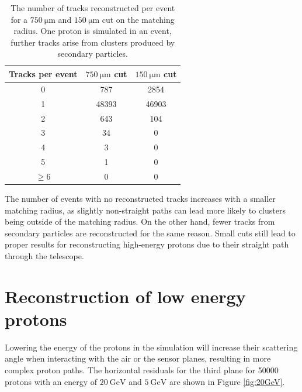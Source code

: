 \begin{table}
  \centering
  \caption{The number of tracks reconstructed per event for a
  $\SI{750}{\micro\meter}$ and $\SI{150}{\micro\meter}$ cut on the
  matching radius. One proton is simulated in an event, further tracks arise from clusters
  produced by secondary particles.}
  \begin{tabular}{c | c c}
    \toprule
    Tracks per event &  $\SI{750}{\micro\meter}$ cut & $\SI{150}{\micro\meter}$ cut\\
    \midrule
    0 & 787    & 2854  \\
    1 & 48393  & 46903  \\
    2 & 643    & 104  \\
    3 & 34     & 0  \\
    4 & 3      & 0   \\
    5 & 1      & 0    \\
    $\geq$6 & 0 & 0 \\
  \end{tabular}
  \label{tab:cluster_per_track}
\end{table}

The number of events with no reconstructed tracks increases with a smaller matching radius, as slightly non-straight paths can lead
more likely to clusters being outside of the matching radius. On the other hand, fewer tracks from secondary particles are reconstructed
for the same reason. Small cuts still lead to proper results
for reconstructing high-energy protons due to their straight path through the telescope.



\section{Reconstruction of low energy protons}\label{sec:energy}
Lowering the energy of the protons in the simulation will increase their scattering angle when interacting with the air or the sensor
planes, resulting in more complex proton paths.
The horizontal residuals for the third plane for 50000 protons with an energy of $\SI{20}{\giga\eV}$ and $\SI{5}{\GeV}$ are shown in Figure \ref{fig:20GeV}.

